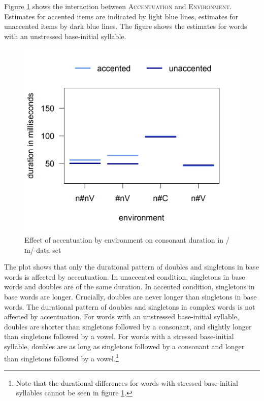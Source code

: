 Figure \ref{fig:Env Acc In complete experiment} shows the interaction between \textsc{Accentuation} and \textsc{Environment}. Estimates for accented items are indicated by light blue lines, estimates for unaccented items by dark blue lines. The figure shows the estimates for words with an unstressed base-initial syllable. 


	\begin{figure}[h!]
		\centering
		\vspace*{-0.3cm}
		\includegraphics [scale=0.5] {images/Experiment/InModelCompleteInterEnvAcc}
		\caption{Effect of accentuation by environment on consonant duration in /ɪn/-data set}
		\label{fig:Env Acc In complete experiment}
	\end{figure}


The plot shows that only the durational pattern of doubles and singletons in base words is affected by accentuation. 
In unaccented condition, singletons in base words and doubles are of the same duration. In accented condition, singletons in base words are longer. Crucially, doubles are never longer than singletons in base words.
The durational pattern of doubles and singletons in complex words is not affected by accentuation. For words with an unstressed base-initial syllable, doubles are shorter than singletons followed by a consonant, and slightly longer than singletons followed by a vowel. For words with a stressed base-initial syllable, doubles are as long as singletons followed by a consonant and longer than singletons followed by a vowel.\footnote{Note that the durational differences for words with stressed base-initial syllables cannot be seen in figure \ref{fig:Env Acc In complete experiment}.} 


